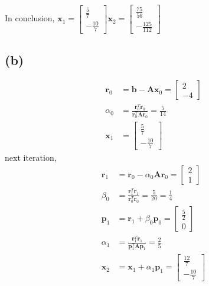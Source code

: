 \documentclass{article}
\begin{document}
In conclusion, \(\bm{x}_1 = \begin{bmatrix}
    \frac{5}{7} \\
    -\frac{10}{7}
\end{bmatrix} \bm{x}_2 = \begin{bmatrix}
    \frac{75}{56} \\
    -\frac{125}{112}
\end{bmatrix}\)

\subsection*{(b)}
\begin{align*}
    \bm{r}_0 &= \bm{b} - \bm{A}\bm{x}_0 = \begin{bmatrix}
        2 \\
        -4
    \end{bmatrix} \\
    \alpha_0 &= \frac{\bm{r}_0^T\bm{r}_0}{\bm{r}_0^T \bm{A} \bm{r}_0} = \frac{5}{14} \\ 
    \bm{x}_1 &= \begin{bmatrix}
        \frac{5}{7} \\
        -\frac{10}{7}
    \end{bmatrix}
\end{align*}
next iteration,
\begin{align*}
    \bm{r}_1 &= \bm{r}_0 - \alpha_0 \bm{A} \bm{r}_0 = \begin{bmatrix}
        2 \\
        1
    \end{bmatrix} \\
    \beta_0 &= \frac{\bm{r}_1^T \bm{r}_1}{\bm{r}_0^T \bm{r}_0} = \frac{5}{20} = \frac{1}{4} \\
    \bm{p}_1 &= \bm{r}_1 + \beta_0\bm{p}_0 = \begin{bmatrix}
        \frac{5}{2} \\
        0
    \end{bmatrix}\ \\
    \alpha_1 &= \frac{\bm{r}_1^T\bm{r}_1}{\bm{p}_1^T \bm{A} \bm{p}_1} = \frac{2}{5} \\
    \bm{x}_2 &= \bm{x}_1 + \alpha_1 \bm{p}_1 = \begin{bmatrix}
        \frac{12}{7} \\
        -\frac{10}{7}
    \end{bmatrix}
\end{align*}
\end{document}

